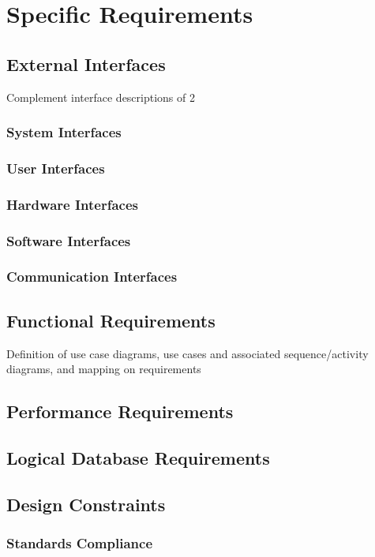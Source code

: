 \section{Specific Requirements}

\subsection{External Interfaces}
Complement interface descriptions of 2
\subsubsection{System Interfaces}
\subsubsection{User Interfaces}
\subsubsection{Hardware Interfaces}
\subsubsection{Software Interfaces}
\subsubsection{Communication Interfaces}


\subsection{Functional Requirements}
Definition of use case diagrams, use cases and associated sequence/activity diagrams, and mapping on requirements

\subsection{Performance Requirements}

\subsection{Logical Database Requirements}

\subsection{Design Constraints}

\subsubsection{Standards Compliance}
